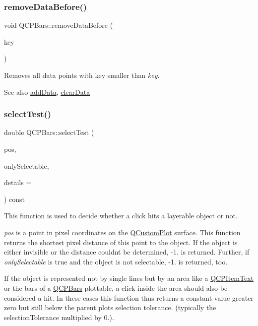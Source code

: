 \subsubsection{\texorpdfstring{remove\+Data\+Before()}{removeDataBefore()}}
{\footnotesize\ttfamily void Q\+C\+P\+Bars\+::remove\+Data\+Before (\begin{DoxyParamCaption}\item[{double}]{key }\end{DoxyParamCaption})}

Removes all data points with key smaller than {\itshape key}. \begin{DoxySeeAlso}{See also}
\hyperlink{class_q_c_p_bars_a1f29cf08615040993209147fa68de3f2}{add\+Data}, \hyperlink{class_q_c_p_bars_a11dbbd707132f07f862dff13c5789c2b}{clear\+Data} 
\end{DoxySeeAlso}
\hypertarget{class_q_c_p_bars_a62d66cc8eedca6bedfc1f6513164d418}{}\label{class_q_c_p_bars_a62d66cc8eedca6bedfc1f6513164d418} 
\subsubsection{\texorpdfstring{select\+Test()}{selectTest()}}
{\footnotesize\ttfamily double Q\+C\+P\+Bars\+::select\+Test (\begin{DoxyParamCaption}\item[{const Q\+PointF \&}]{pos,  }\item[{bool}]{only\+Selectable,  }\item[{Q\+Variant $\ast$}]{details = {} }\end{DoxyParamCaption}) const\hspace{0.3cm}{\ttfamily [virtual]}}

This function is used to decide whether a click hits a layerable object or not.

{\itshape pos} is a point in pixel coordinates on the \hyperlink{class_q_custom_plot}{Q\+Custom\+Plot} surface. This function returns the shortest pixel distance of this point to the object. If the object is either invisible or the distance couldn\textquotesingle{}t be determined, -\/1. is returned. Further, if {\itshape only\+Selectable} is true and the object is not selectable, -\/1. is returned, too.

If the object is represented not by single lines but by an area like a \hyperlink{class_q_c_p_item_text}{Q\+C\+P\+Item\+Text} or the bars of a \hyperlink{class_q_c_p_bars}{Q\+C\+P\+Bars} plottable, a click inside the area should also be considered a hit. In these cases this function thus returns a constant value greater zero but still below the parent plot\textquotesingle{}s selection tolerance. (typically the selection\+Tolerance multiplied by 0.).

